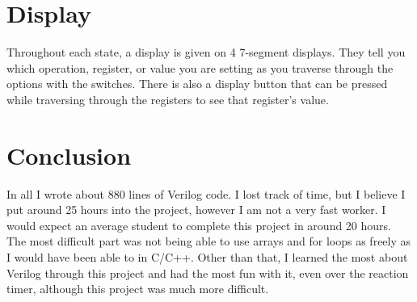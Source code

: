 \documentclass{article}
\begin{document}
\section{Display}
Throughout each state, a display is given on 4 7-segment displays.  They tell you which operation, register, or value you are setting as you traverse through the options with the switches.  There is also a display button that can be pressed while traversing through the registers to see that register's value.

\section{Conclusion}
In all I wrote about 880 lines of Verilog code.  I lost track of time, but I believe I put around 25 hours into the project, however I am not a very fast worker.  I would expect an average student to complete this project in around 20 hours.  The most difficult part was not being able to use arrays and for loops as freely as I would have been able to in C/C++.  Other than that, I learned the most about Verilog through this project and had the most fun with it, even over the reaction timer, although this project was much more difficult.
\end{document}
